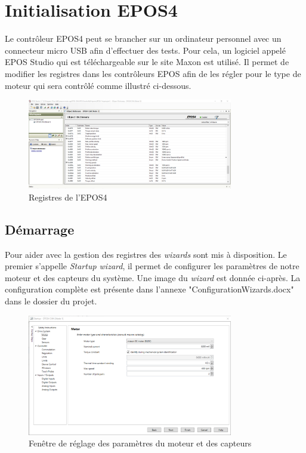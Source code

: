 \section{Initialisation EPOS4}
Le contrôleur EPOS4 peut se brancher sur un ordinateur personnel avec un connecteur micro USB afin d'effectuer des tests. Pour cela, un logiciel
appelé EPOS Studio qui est téléchargeable sur le site Maxon\cite{Maxon} est utilisé. Il permet de modifier les registres dans les contrôleurs EPOS
afin de les régler pour le type de moteur qui sera contrôlé comme illustré ci-dessous.

\begin{figure}[H]
    \centering
    \includegraphics[width = 0.8\textwidth]{assets/figures/Registres.png}
    \caption{Registres de l'EPOS4}
    \label{fig:Registres}
\end{figure}

\subsection{Démarrage}
Pour aider avec la gestion des registres des \textit{wizards} sont mis à disposition. Le premier s'appelle \textit{Startup wizard}, il permet
de configurer les paramètres de notre moteur et des capteurs du système. Une image du \textit{wizard} est donnée ci-après. La configuration
complète est présente dans l'annexe "ConfigurationWizards.docx" dans le dossier du projet.

\begin{figure}[H]
    \centering
    \includegraphics[width = 0.8\textwidth]{assets/figures/StartupWizard.png}
    \caption{Fenêtre de réglage des paramètres du moteur et des capteurs}
    \label{fig:StartWizard}
\end{figure}

